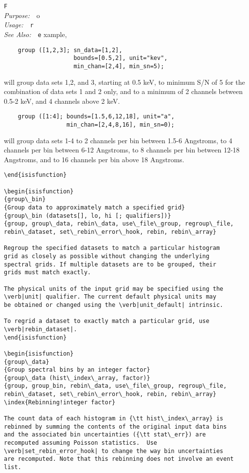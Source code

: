 \documentclass{book}
\makeatletter
\newif\ifpdf
\newenvironment{isisfunction}[4]%
{\index{{#1}@{\tt #1}}%
  \ifpdf
  \else
     \addcontentsline{toc}{subsection}{{#1} -- {#2}}
  \fi
  \vbox{
          \vspace*{\baselineskip}
          {\LARGE\tt #1}\vspace*{\baselineskip}\\
          {{\it Purpose:}~~{#2}}\\
          {{\it Usage:}~~{\tt #3}}\\
          {{\it See Also:}~~{\tt #4}}
       }
}%
{ }
\makeatother
\begin{document}
{\begin{isisfunction}
For example,
\begin{verbatim}
    group ([1,2,3]; sn_data=[1,2],
                    bounds=[0.5,2], unit="kev",
                    min_chan=[2,4], min_sn=5);
\end{verbatim}
will group data sets 1,2, and 3, starting at 0.5 keV, to minimum S/N of
5 for the combination of data sets 1 and 2 only, and to a minimum of 2
channels between 0.5-2 keV, and 4 channels above 2 keV.
\begin{verbatim}
    group ([1:4]; bounds=[1.5,6,12,18], unit="a",
                  min_chan=[2,4,8,16], min_sn=0);
\end{verbatim}
will group data sets 1-4 to 2 channels per bin between 1.5-6
Angstroms, to 4 channels per bin between 6-12 Angstroms, to 8
channels per bin between 12-18 Angstroms, and to 16 channels
per bin above 18 Angstroms.
\begin{verbatim}
\end{isisfunction}

\begin{isisfunction}
{group\_bin}
{Group data to approximately match a specified grid}
{group\_bin (datasets[], lo, hi [; qualifiers])}
{group, group\_data, rebin\_data, use\_file\_group, regroup\_file, rebin\_dataset, set\_rebin\_error\_hook, rebin, rebin\_array}

Regroup the specified datasets to match a particular histogram
grid as closely as possible without changing the underlying
spectral grids. If multiple datasets are to be grouped, their
grids must match exactly.

The physical units of the input grid may be specified using the
\verb|unit| qualifier. The current default physical units may
be obtained or changed using the \verb|unit_default| intrinsic.

To regrid a dataset to exactly match a particular grid, use
\verb|rebin_dataset|.
\end{isisfunction}

\begin{isisfunction}
{group\_data}
{Group spectral bins by an integer factor}
{group\_data (hist\_index\_array, factor)}
{group, group_bin, rebin\_data, use\_file\_group, regroup\_file, rebin\_dataset, set\_rebin\_error\_hook, rebin, rebin\_array}
\index{Rebinning!integer factor}

The count data of each histogram in {\tt hist\_index\_array} is
rebinned by summing the contents of the original input data bins
and the associated bin uncertainties ({\tt stat\_err}) are
recomputed assuming Poisson statistics.  Use
\verb|set_rebin_error_hook| to change the way bin uncertainties
are recomputed. Note that this rebinning does not involve an event
list.


\end{verbatim}
\end{isisfunction}}
\end{document}
